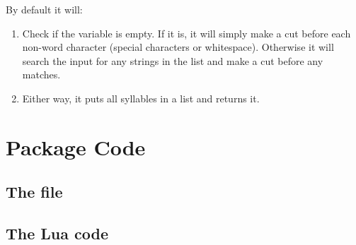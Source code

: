 \documentclass{ltxdockit}
\begin{document}
By default it will:

\begin{enumerate}
  \item Check if the  variable is empty. If
    it is, it will simply make a cut before each non-word character (special
    characters or whitespace). Otherwise it will search the input for any
    strings in the list and make a cut before any matches.
  \item Either way, it puts all syllables in a list and returns it.
\end{enumerate}

\section{Package Code}

\subsection{The  file}

\subsection{The Lua code}
\end{document}
